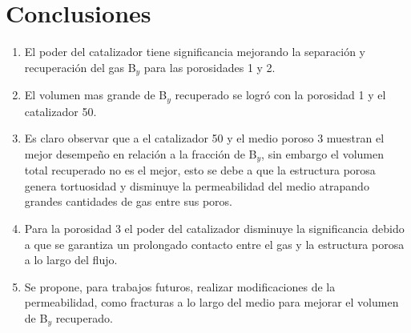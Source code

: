 \documentclass{article}
\begin{document}
\section{Conclusiones}
 \begin{enumerate}
     \item  El poder del catalizador tiene significancia mejorando la separación y recuperación del gas B$_y$ para las porosidades 1 y 2.
     \item  El volumen mas grande de B$_y$ recuperado se logró con la porosidad 1 y el catalizador 50. 
     \item Es claro observar que a el catalizador 50 y el medio poroso 3 muestran el mejor desempeño en relación a la fracción de B$_y$, sin embargo el volumen total recuperado no es el mejor, esto se debe a que la estructura porosa genera tortuosidad y disminuye la permeabilidad del medio atrapando grandes cantidades de gas entre sus poros.
     \item Para la porosidad 3 el poder del catalizador disminuye la significancia debido a que se garantiza un prolongado contacto entre el gas y la estructura porosa a lo largo del flujo.
     \item Se propone, para trabajos futuros, realizar modificaciones de la permeabilidad, como fracturas a lo largo del medio para mejorar el volumen de B$_y$ recuperado. 
 \end{enumerate}


\end{document}
